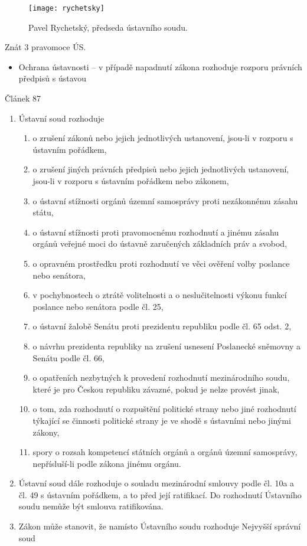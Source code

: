 \documentclass[10pt,a4paper,
twoside,%
]{report}
\newcommand{\ust}[1]{\begin{footnotesize}%
\begin{center}
Článek #1
\end{center}
\end{footnotesize}}%
\begin{document}
\begin{figure}
\texttt{[image: rychetsky]}
\caption{Pavel Rychetský, předseda ústavního soudu.}
\end{figure}

Znát 3 pravomoce ÚS. 
\begin{itemize}
\item  Ochrana ústavnosti -- v případě napadnutí zákona rozhoduje rozporu právních předpisů s ústavou
\end{itemize}

\begin{small}
\ust{87}
\begin{enumerate}
\item Ústavní soud rozhoduje\begin{enumerate}

\item o zrušení zákonů nebo jejich jednotlivých ustanovení, jsou-li v rozporu s ústavním pořádkem,
\item o zrušení jiných právních předpisů nebo jejich jednotlivých ustanovení, jsou-li v rozporu s ústavním pořádkem nebo zákonem, 
\item o ústavní stížnosti orgánů územní samosprávy proti nezákonnému zásahu státu,
\item o ústavní stížnosti proti pravomocnému rozhodnutí a jinému zásahu orgánů veřejné moci do ústavně zaručených základních práv a svobod,
\item o opravném prostředku proti rozhodnutí ve věci ověření volby poslance nebo senátora,
\item v pochybnostech o ztrátě volitelnosti a o neslučitelnosti výkonu funkcí poslance nebo senátora podle čl. 25,
\item o ústavní žalobě Senátu proti prezidentu republiku podle čl. 65 odst. 2,
\item o návrhu prezidenta republiky na zrušení usnesení Poslanecké sněmovny a Senátu podle čl. 66,
\item o opatřeních nezbytných k provedení rozhodnutí mezinárodního soudu, které je pro Českou republiku závazné, pokud je nelze provést jinak,
\item o tom, zda rozhodnutí o rozpuštění politické strany nebo jiné rozhodnutí týkající se činnosti politické strany je ve shodě s ústavními nebo jinými zákony,
\item spory o rozsah kompetencí státních orgánů a orgánů územní samosprávy, nepřísluší-li podle zákona jinému orgánu. 
\end{enumerate}
\item Ústavní soud dále rozhoduje o souladu mezinárodní smlouvy podle čl. 10a a čl. 49 s ústavním pořádkem, a to před její ratifikací. Do rozhodnutí Ústavního soudu nemůže být smlouva ratifikována.
\item Zákon může stanovit, že namísto Ústavního soudu rozhoduje Nejvyšší správní soud \begin{enumerate}


\end{enumerate}
\end{enumerate}
\end{small}
\end{document}
